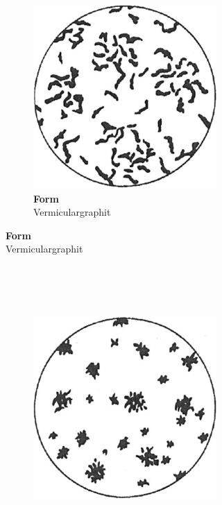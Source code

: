 \documentclass[
fontsize=10pt, 
listof = totoc,
parskip = half	
]{report}
\newcommand{\uproman}[1]{\uppercase\expandafter{\romannumeral#1}}
\begin{document}
\begin{figure}[h]
\begin{subfigure}{1.0\linewidth}
\begin{subfigure}{0.33\textwidth}
		\end{subfigure}\hfill
		\begin{subfigure}{0.33\textwidth}
			\centering
			\includegraphics[scale=0.25]{pics/graphit_form3}
			\caption*{\textbf{Form \uproman{3}}\\Vermiculargraphit}
		\end{subfigure}
	\end{subfigure}
	\\\\\\
	\begin{subfigure}{1.0\linewidth}
		\begin{subfigure}[t]{0.33\textwidth}
			\centering
			\includegraphics[scale=0.25]{pics/graphit_form4}

\end{subfigure}
\end{subfigure}
\end{figure}
\end{document}

